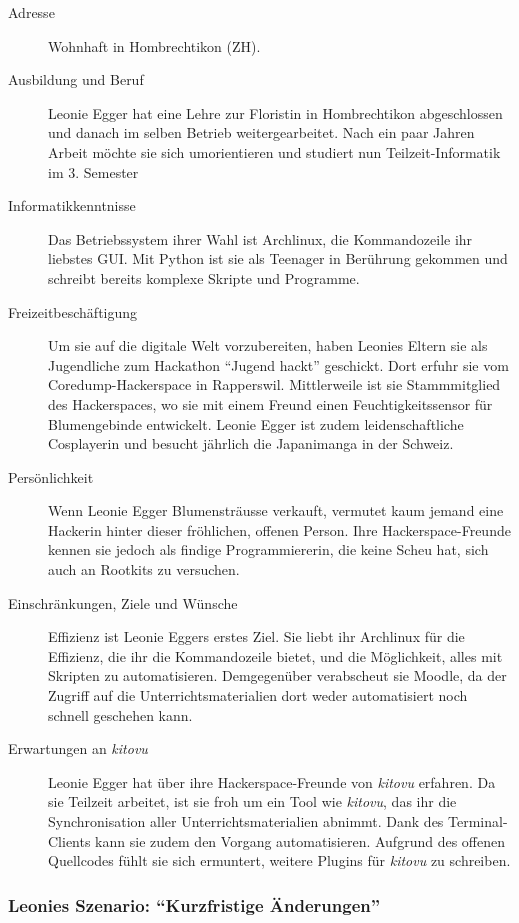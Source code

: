 \documentclass[a4paper]{article}
\begin{document}
\begin{description}
	\item[Adresse] Wohnhaft in Hombrechtikon (ZH).
	\item[Ausbildung und Beruf] Leonie Egger hat eine Lehre zur Floristin in Hombrechtikon abgeschlossen und danach im selben Betrieb weitergearbeitet. Nach ein paar Jahren Arbeit möchte sie sich umorientieren und studiert nun Teilzeit-Informatik im 3. Semester
	\item[Informatikkenntnisse] Das Betriebssystem ihrer Wahl ist Archlinux, die Kommandozeile ihr liebstes GUI. Mit Python ist sie als Teenager in Berührung gekommen und schreibt bereits komplexe Skripte und Programme.
	\item[Freizeitbeschäftigung] Um sie auf die digitale Welt vorzubereiten, haben Leonies Eltern sie als Jugendliche zum Hackathon ``Jugend hackt'' geschickt. Dort erfuhr sie vom Coredump-Hackerspace in Rapperswil. Mittlerweile ist sie Stammmitglied des Hackerspaces, wo sie mit einem Freund einen Feuchtigkeitssensor für Blumengebinde entwickelt. Leonie Egger ist zudem leidenschaftliche Cosplayerin und besucht jährlich die Japanimanga in der Schweiz.
	\item[Persönlichkeit] Wenn Leonie Egger Blumensträusse verkauft, vermutet kaum jemand eine Hackerin hinter dieser fröhlichen, offenen Person. Ihre Hackerspace-Freunde kennen sie jedoch als findige Programmiererin, die keine Scheu hat, sich auch an Rootkits zu versuchen.
	\item[Einschränkungen, Ziele und Wünsche] Effizienz ist Leonie Eggers erstes Ziel. Sie liebt ihr Archlinux für die Effizienz, die ihr die Kommandozeile bietet, und die Möglichkeit, alles mit Skripten zu automatisieren. Demgegenüber verabscheut sie Moodle, da der Zugriff auf die Unterrichtsmaterialien dort weder automatisiert noch schnell geschehen kann.
	\item[Erwartungen an \emph{kitovu}] Leonie Egger hat über ihre Hackerspace-Freunde von \emph{kitovu} erfahren. Da sie Teilzeit arbeitet, ist sie froh um ein Tool wie \emph{kitovu}, das ihr die Synchronisation aller Unterrichtsmaterialien abnimmt. Dank des Terminal-Clients kann sie zudem den Vorgang automatisieren. Aufgrund des offenen Quellcodes fühlt sie sich ermuntert, weitere Plugins für \emph{kitovu} zu schreiben.
\end{description}

\subsubsection{Leonies Szenario: ``Kurzfristige Änderungen''}
\end{document}
